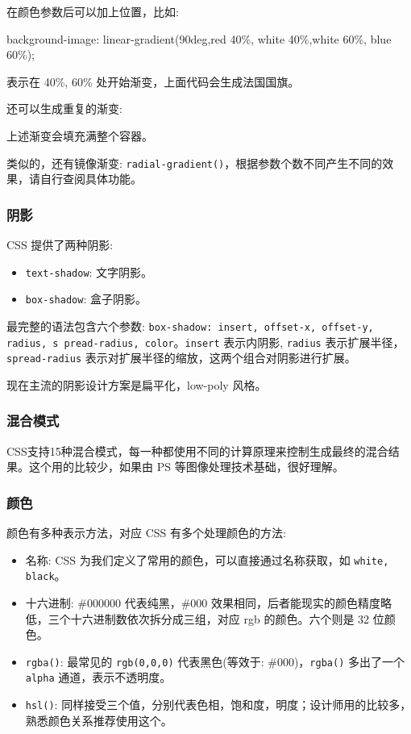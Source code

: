 在颜色参数后可以加上位置，比如:

\begin{HTML}
background-image: linear-gradient(90deg,red 40\%, white 40\%,white 60\%, blue 60\%);
\end{HTML}

表示在 40\%, 60\% 处开始渐变，上面代码会生成法国国旗。

还可以生成重复的渐变:


上述渐变会填充满整个容器。

类似的，还有镜像渐变: \texttt{radial-gradient()}，根据参数个数不同产生不同的效果，请自行查阅具体功能。

\subsubsection*{阴影}

CSS 提供了两种阴影:
\begin{itemize}
    \item \texttt{text-shadow}: 文字阴影。
    \item \texttt{box-shadow}: 盒子阴影。
\end{itemize}

最完整的语法包含六个参数: \texttt{box-shadow: insert, offset-x, offset-y, radius, s pread-radius, color}。\texttt{insert} 表示内阴影, \texttt{radius} 表示扩展半径，\texttt{spread-radius} 表示对扩展半径的缩放，这两个组合对阴影进行扩展。

现在主流的阴影设计方案是扁平化，low-poly 风格。

\subsubsection*{混合模式}

CSS支持15种混合模式，每一种都使用不同的计算原理来控制生成最终的混合结果。这个用的比较少，如果由 PS 等图像处理技术基础，很好理解。

\subsubsection*{颜色}

颜色有多种表示方法，对应 CSS 有多个处理颜色的方法:
\begin{itemize}
    \item 名称: CSS 为我们定义了常用的颜色，可以直接通过名称获取，如 \texttt{white, black}。
    \item 十六进制: \#000000 代表纯黑，\#000 效果相同，后者能现实的颜色精度略低，三个十六进制数依次拆分成三组，对应 rgb 的颜色。六个则是 32 位颜色。
    \item \texttt{rgba()}: 最常见的 \texttt{rgb(0,0,0)} 代表黑色(等效于: \#000)，\texttt{rgba()} 多出了一个 \texttt{alpha} 通道，表示不透明度。
    \item \texttt{hsl()}: 同样接受三个值，分别代表色相，饱和度，明度；设计师用的比较多，熟悉颜色关系推荐使用这个。
\end{itemize}

